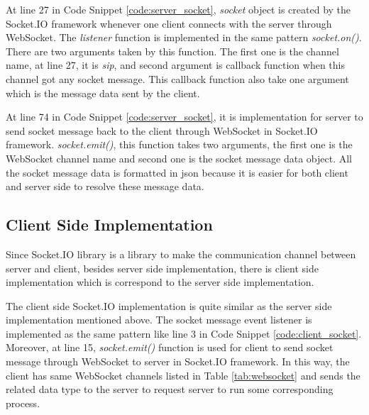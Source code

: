\par At line 27 in Code Snippet \ref{code:server_socket}, \textit{socket} object is created by the Socket.IO framework whenever one client connects with the server through WebSocket. The \textit{listener} function is implemented in the same pattern \textit{socket.on()}. There are two arguments taken by this function. The first one is the channel name, at line 27, it is \textit{sip}, and second argument is callback function when this channel got any socket message. This callback function also take one argument which is the message data sent by the client.

\par At line 74 in Code Snippet \ref{code:server_socket}, it is implementation for server to send socket message back to the client through WebSocket in Socket.IO framework. \textit{socket.emit()}, this function takes two arguments, the first one is the WebSocket channel name and second one is the socket message data object. All the socket message data is formatted in \gls{json} because it is easier for both client and server side to resolve these message data.

\subsection{Client Side Implementation}

\par Since Socket.IO library is a library to make the communication channel between server and client, besides server side implementation, there is client side implementation which is correspond to the server side implementation.

\par The client side Socket.IO implementation is quite similar as the server side implementation mentioned above. The socket message event listener is implemented as the same pattern like line 3 in Code Snippet \ref{code:client_socket}. Moreover, at line 15, \textit{socket.emit()} function is used for client to send socket message through WebSocket to server in Socket.IO framework. In this way, the client has same WebSocket channels listed in Table \ref{tab:websocket} and sends the related data type to the server to request server to run some corresponding process.

